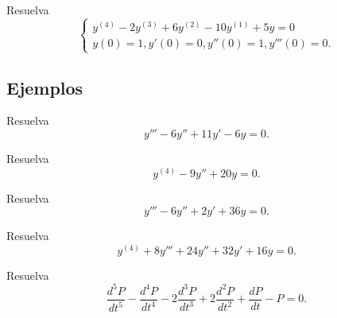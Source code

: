 \begin{problema}
	Resuelva
	$$\begin{cases}
		y^{(4)}-2y^{(3)}+6y^{(2)}-10y^{(1)}+5y=0 \\
		y(0)=1, y'(0)=0, y''(0)=1, y'''(0)=0.
	\end{cases}
	$$
\end{problema}



\subsection{Ejemplos}


\begin{problema}
	\label{bron:exmp:10.1}
	Resuelva
	$$
	y'''-6y''+11y'-6y=0.
	$$
\end{problema}




\begin{problema}
	\label{bron:10.2}
	Resuelva
	$$
	y^{(4)}-9y''+20y=0.
	$$
\end{problema}




\begin{problema}
	\label{bron:10.4}
	Resuelva
	$$
	y'''-6y''+2y'+36y=0.
	$$
\end{problema}




\begin{problema}
	\label{bron:10.6}
	Resuelva
	$$
	y^{(4)}+8y'''+24y''+32y'+16y=0.
	$$
\end{problema}




\begin{problema}
	\label{bron:10.7}
	Resuelva
	$$
	\dfrac{d^{5}P}{dt^{5}}
	-\dfrac{d^{4}P}{dt^{4}}
	-2\dfrac{d^{3}P}{dt^{3}}
	+2\dfrac{d^{2}P}{dt^{2}}
	+\dfrac{dP}{dt}-P=0.
	$$
\end{problema}



